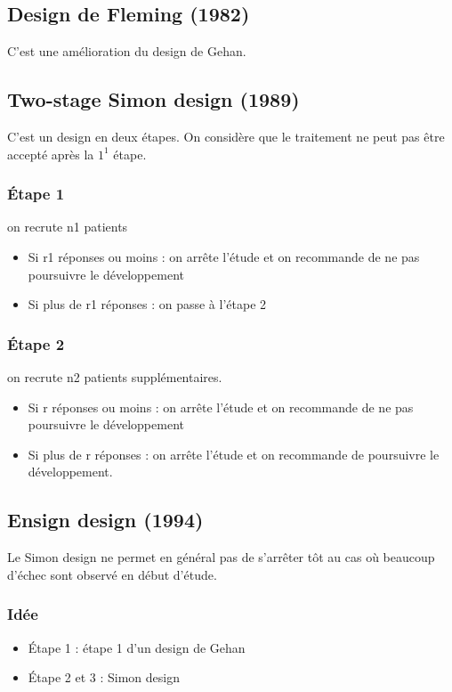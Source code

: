 \subsection{Design de Fleming (1982)}
C'est une amélioration du design de Gehan. 

\subsection{Two-stage Simon design (1989)}
C'est un design en deux étapes. On considère que le traitement ne peut pas être accepté après la $1^{1}$ étape. 
\subsubsection{Étape 1}
on recrute n1 patients
\begin{itemize}
    \item Si r1 réponses ou moins : on arrête l’étude et on recommande de ne
pas poursuivre le développement
     \item Si plus de r1 réponses : on passe à l’étape 2 
\end{itemize}
\subsubsection{Étape 2}
on recrute n2 patients supplémentaires.
\begin{itemize}
    \item Si r réponses ou moins : on arrête l’étude et on recommande de ne pas
poursuivre le développement
   \item Si plus de r réponses : on arrête l’étude et on recommande de poursuivre le développement.
\end{itemize}
\subsection{Ensign design (1994)}
Le Simon design ne permet en général pas de s’arrêter tôt au cas où beaucoup d’échec sont observé en début d’étude.

\subsubsection{Idée}
\begin{itemize}
    \item Étape 1 : étape 1 d’un design de Gehan
    \item Étape 2 et 3 : Simon design 
\end{itemize}

